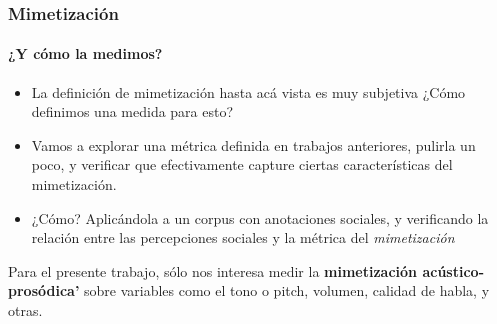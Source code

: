 \begin{frame}
  \frametitle{Mimetización}
  \framesubtitle{¿Y cómo la medimos?}

  \begin{itemize}
    \item La definición de mimetización hasta acá vista es muy subjetiva ¿Cómo definimos una medida para esto?
    \item Vamos a explorar una métrica definida en trabajos anteriores, pulirla un poco, y verificar que efectivamente capture ciertas características del mimetización.
    \item ¿Cómo? Aplicándola a un corpus con anotaciones sociales, y verificando la relación entre las percepciones sociales y la métrica del \emph{mimetización}
  \end{itemize}


  Para el presente trabajo, sólo nos interesa medir la \textbf{mimetización acústico-prosódica'} sobre variables como el tono o pitch, volumen, calidad de habla, y otras.
\end{frame}
